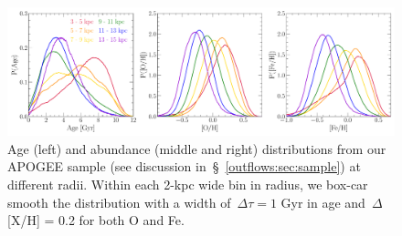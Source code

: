 \begin{landscape}
\begin{figure}
\centering
\includegraphics[scale = 0.55]{age_xh_dists.pdf}
\caption{
Age (left) and abundance (middle and right) distributions from our APOGEE
sample (see discussion in~\S~\ref{outflows:sec:sample}) at different
radii.
Within each 2-kpc wide bin in radius, we box-car smooth the distribution with a
width of~$\Delta \tau = 1$ Gyr in age and~$\Delta$[X/H] = 0.2 for both O and
Fe.
}
\label{outflows:fig:age-xh-dists}
\end{figure}
\end{landscape}

